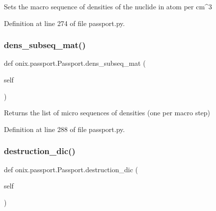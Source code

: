 \begin{DoxyVerb}Sets the macro sequence of densities of the nuclide in atom per cm^3\end{DoxyVerb}
 

Definition at line 274 of file passport.\+py.

\mbox{\label{classonix_1_1passport_1_1Passport_a44c355e9c91a9847add14cec69ef0a52}} 
\subsubsection{\texorpdfstring{dens\+\_\+subseq\+\_\+mat()}{dens\_subseq\_mat()}}
{\footnotesize\ttfamily def onix.\+passport.\+Passport.\+dens\+\_\+subseq\+\_\+mat (\begin{DoxyParamCaption}\item[{}]{self }\end{DoxyParamCaption})}

\begin{DoxyVerb}Returns the list of micro sequences of densities (one per macro step)\end{DoxyVerb}
 

Definition at line 288 of file passport.\+py.

\mbox{\label{classonix_1_1passport_1_1Passport_a72309e1d174814115256e4504e3893fe}} 
\subsubsection{\texorpdfstring{destruction\+\_\+dic()}{destruction\_dic()}\hspace{0.1cm}{\footnotesize\ttfamily [1/2]}}
{\footnotesize\ttfamily def onix.\+passport.\+Passport.\+destruction\+\_\+dic (\begin{DoxyParamCaption}\item[{}]{self }\end{DoxyParamCaption})}

